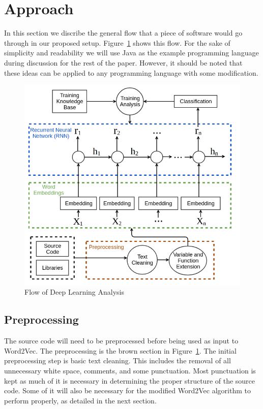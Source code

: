 \section{Approach} \label{approach}

In this section we discribe the general flow that a piece of software would go through in our proposed setup. Figure~\ref{deeplearningflow} shows this flow. For the sake of simplicity and readability we will use Java as the example programming language during discussion for the rest of the paper. However, it should be noted that these ideas can be applied to any programming language with some modification.

\begin{figure}
   \centering
   \includegraphics[scale=.36]{figures/deeplearningflow.png}
   \caption{Flow of Deep Learning Analysis}
   \vspace{-.6cm}
   \label{deeplearningflow}
\end{figure}

\subsection{Preprocessing}

The source code will need to be preprocessed before being used as input to Word2Vec. The preprocessing is the brown section in Figure~\ref{deeplearningflow}. The initial preprocessing step is basic text cleaning. This includes the removal of all unnecessary white space, comments, and some punctuation. Most punctuation is kept as much of it is necessary in determining the proper structure of the source code. Some of it will also be necessary for the modified Word2Vec algorithm to perform properly, as detailed in the next section.

